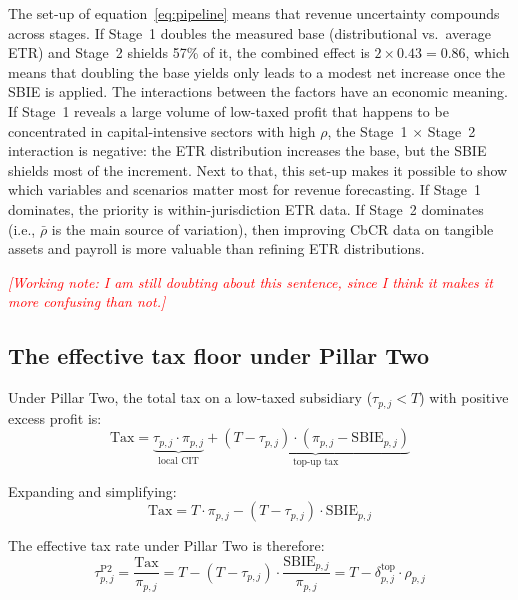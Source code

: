 \documentclass[11pt,a4paper]{article}
\newcommand{\workingnote}[1]{\ifworkingdoc\par\noindent\textcolor{red}{\textit{[Working note: #1]}}\par\fi}
\begin{document}
The set-up of equation~\eqref{eq:pipeline} means that revenue uncertainty compounds across stages. If Stage~1 doubles the measured base (distributional vs.\ average ETR) and Stage~2 shields 57\% of it, the combined effect is $2 \times 0.43 = 0.86$, which means that doubling the base yields only leads to a modest net increase once the SBIE is applied. The interactions between the factors have an economic meaning. If Stage~1 reveals a large volume of low-taxed profit that happens to be concentrated in capital-intensive sectors with high $\rho$, the Stage~1 $\times$ Stage~2 interaction is negative: the ETR distribution increases the base, but the SBIE shields most of the increment. Next to that, this set-up makes it possible to show which variables and scenarios matter most for revenue forecasting. If Stage~1 dominates, the priority is within-jurisdiction ETR data. If Stage~2 dominates (i.e., $\bar{\rho}$ is the main source of variation), then improving CbCR data on tangible assets and payroll is more valuable than refining ETR distributions. \workingnote{I am still doubting about this sentence, since I think it makes it more confusing than not.} 

\subsection{The effective tax floor under Pillar Two}\label{sec:floor_theory}

Under Pillar Two, the total tax on a low-taxed subsidiary ($\tau_{p,j} < T$) with positive excess profit is:
\begin{equation}\label{eq:total_tax}
\text{Tax} = \underbrace{\tau_{p,j} \cdot \pi_{p,j}}_{\text{local CIT}} + \underbrace{(T - \tau_{p,j}) \cdot (\pi_{p,j} - \text{SBIE}_{p,j})}_{\text{top-up tax}}
\end{equation}

Expanding and simplifying:
\begin{equation}\label{eq:total_tax_simplified}
\text{Tax} = T \cdot \pi_{p,j} - (T - \tau_{p,j}) \cdot \text{SBIE}_{p,j}
\end{equation}

The effective tax rate under Pillar Two is therefore:
\begin{equation}\label{eq:etr_pillar2}
\tau_{p,j}^{\text{P2}} = \frac{\text{Tax}}{\pi_{p,j}} = T - (T - \tau_{p,j}) \cdot \frac{\text{SBIE}_{p,j}}{\pi_{p,j}} = T - \delta_{p,j}^{\text{top}} \cdot \rho_{p,j}
\end{equation}
\end{document}

